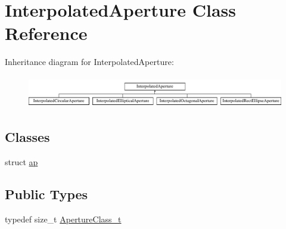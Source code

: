 \hypertarget{classInterpolatedAperture}{}\section{Interpolated\+Aperture Class Reference}
\label{classInterpolatedAperture}
Inheritance diagram for Interpolated\+Aperture\+:\begin{figure}[H]
\begin{center}
\leavevmode
\includegraphics[height=1.414141cm]{classInterpolatedAperture}
\end{center}
\end{figure}
\subsection*{Classes}
\begin{DoxyCompactItemize}
\item 
struct \hyperlink{structInterpolatedAperture_1_1ap}{ap}
\end{DoxyCompactItemize}
\subsection*{Public Types}
\begin{DoxyCompactItemize}
\item 
typedef size\+\_\+t \hyperlink{classInterpolatedAperture_a39433c0172ff3f57ea3daefaff6fcc74}{Aperture\+Class\+\_\+t}
\end{DoxyCompactItemize}
